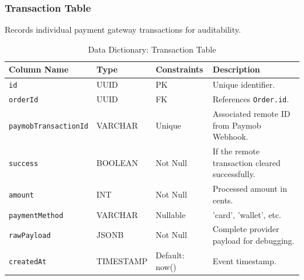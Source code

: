 \subsubsection{Transaction Table}
Records individual payment gateway transactions for auditability.
\begin{table}[H]
\centering
\renewcommand{\arraystretch}{1.3}
\begin{tabularx}{\textwidth}{|l|l|l|X|}
\hline
\textbf{Column Name} & \textbf{Type} & \textbf{Constraints} & \textbf{Description} \\
\hline
\texttt{id} & UUID & PK & Unique identifier. \\
\hline
\texttt{orderId} & UUID & FK & References \texttt{Order.id}. \\
\hline
\texttt{paymobTransactionId} & VARCHAR & Unique & Associated remote ID from Paymob Webhook. \\
\hline
\texttt{success} & BOOLEAN & Not Null & If the remote transaction cleared successfully. \\
\hline
\texttt{amount} & INT & Not Null & Processed amount in cents. \\
\hline
\texttt{paymentMethod} & VARCHAR & Nullable & 'card', 'wallet', etc. \\
\hline
\texttt{rawPayload} & JSONB & Not Null & Complete provider payload for debugging. \\
\hline
\texttt{createdAt} & TIMESTAMP & Default: now() & Event timestamp. \\
\hline
\end{tabularx}
\caption{Data Dictionary: Transaction Table}
\label{tab:dict-transaction}
\end{table}

